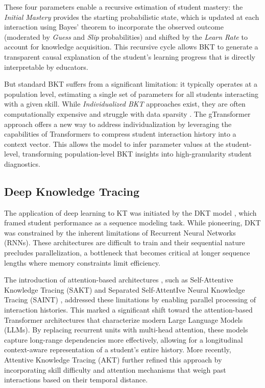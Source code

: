 \documentclass[applsci,article,submit,moreauthors,pdftex]{Definitions/mdpi}
\begin{document}
These four parameters enable a recursive estimation of student mastery: the \textit{Initial Mastery} provides the starting probabilistic state, which is updated at each interaction using Bayes' theorem to incorporate the observed outcome (moderated by \textit{Guess} and \textit{Slip} probabilities) and shifted by the \textit{Learn Rate} to account for knowledge acquisition. This recursive cycle allows BKT to generate a transparent causal explanation of the student's learning progress that is directly interpretable by educators.

But standard BKT suffers from a significant limitation: it typically operates at a population level, estimating a single set of parameters for all students interacting with a given skill. While \textit{Individualized BKT} approaches exist, they are often computationally expensive and struggle with data sparsity \citep{yudelson2013individualized}. The gTransformer approach offers a new way to address individualization by leveraging the capabilities of Transformers to compress student interaction history into a context vector. This allows the model to infer parameter values at the student-level, transforming population-level BKT insights into high-granularity student diagnostics.

\subsection{Deep Knowledge Tracing}

The application of deep learning to KT was initiated by the DKT model \citep{piech2015deep}, which framed student performance as a sequence modeling task. While pioneering, DKT was constrained by the inherent limitations of Recurrent Neural Networks (RNNs). These architectures are difficult to train \citep{Pascanu20132347} and their sequential nature precludes parallelization, a bottleneck that becomes critical at longer sequence lengths where memory constraints limit efficiency. 

The introduction of attention-based architectures \citep{vaswani2017attention}, such as Self-Attentive Knowledge Tracing (SAKT) \citep{Pandey2019384} and Separated Self-AttentIve Neural Knowledge Tracing (SAINT) \citep{choi2020towards}, addressed these limitations by enabling parallel processing of interaction histories. This marked a significant shift toward the attention-based Transformer architectures that characterize modern Large Language Models (LLMs). By replacing recurrent units with multi-head attention, these models capture long-range dependencies more effectively, allowing for a longitudinal context-aware representation of a student's entire history. More recently, Attentive Knowledge Tracing (AKT) \citep{ghosh2020context} further refined this approach by incorporating skill difficulty and attention mechanisms that weigh past interactions based on their temporal distance. 
\end{document}
